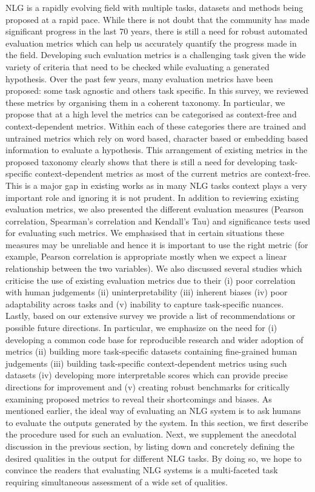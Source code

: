 NLG is a rapidly evolving field with multiple tasks, datasets and methods being proposed at a rapid pace. While there is not doubt that the community has made significant progress in the last 70 years, there is still a need for robust automated evaluation metrics which can help us accurately quantify the progress made in the field. Developing such evaluation metrics is a challenging task given the wide variety of criteria that need to be checked while evaluating a generated hypothesis. Over the past few years, many evaluation metrics have been proposed: some task agnostic and others task specific. In this survey, we reviewed these metrics by organising them in a coherent taxonomy. In particular, we propose that at a high level the metrics can be categorised as context-free and context-dependent metrics. Within each of these categories there are trained and untrained metrics which rely on word based, character based or embedding based information to evaluate a hypothesis. This arrangement of existing metrics in the proposed taxonomy clearly shows that there is still a need for developing task-specific context-dependent metrics as most of the current metrics are context-free. This is a major gap in existing works as in many NLG tasks context plays a very important role and ignoring it is not prudent.
In addition to reviewing existing evaluation metrics, we also presented the different evaluation measures (Pearson correlation, Spearman's correlation and Kendall's Tau) and significance tests used for evaluating such metrics. We emphasised that in certain situations these measures may be unreliable and hence it is important to use the right metric (for example, Pearson correlation is appropriate mostly when we expect a linear relationship between the two variables). We also discussed several studies which criticise the use of existing evaluation metrics due to their  (i) poor correlation with human judgements (ii) uninterpretability (iii) inherent biases (iv) poor adaptability across tasks and (v) inability to capture task-specific nuances. Lastly, based on our extensive survey we provide a list of recommendations or possible future directions. In particular, we emphasize on the need for (i) developing a common code base for reproducible research and wider adoption of metrics (ii) building more task-specific datasets containing fine-grained human judgements (iii) building task-specific context-dependent metrics using such datasets (iv) developing more interpretable scores which can provide precise directions for improvement and (v) creating robust benchmarks for critically examining proposed metrics to reveal their shortcomings and biases.
\label{sec:human_eval}
As mentioned earlier, the ideal way of evaluating an NLG system is to ask humans to evaluate the outputs generated by the system. In this section, we first describe the procedure used for such an evaluation. Next, we supplement the anecdotal discussion in the previous section, by listing down and concretely defining the desired qualities in the output for different NLG tasks. By doing so, we hope to convince the readers that evaluating NLG systems is a multi-faceted task requiring simultaneous assessment of a wide set of qualities.


